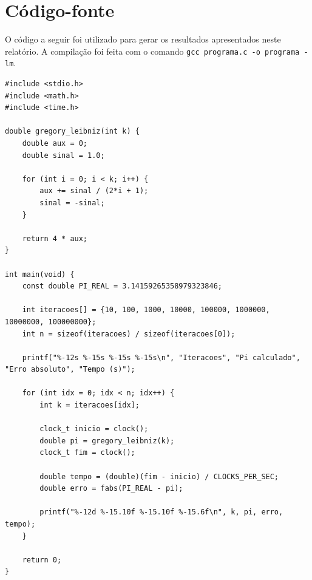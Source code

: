 \documentclass[a4paper,12pt]{article}
\begin{document}
\newpage
\appendix

\section{Código-fonte}
\label{ap:codigo}

O código a seguir foi utilizado para gerar os resultados apresentados neste
relatório. A compilação foi feita com o comando \texttt{gcc programa.c -o
programa -lm}.

\begin{lstlisting}[style=cstyle, caption={Cálculo da aproximação de $\pi$ pela série de Gregory-Leibniz}, label={lst:codigo}]
#include <stdio.h>
#include <math.h>
#include <time.h>

double gregory_leibniz(int k) {
    double aux = 0;
    double sinal = 1.0;

    for (int i = 0; i < k; i++) {
        aux += sinal / (2*i + 1);
        sinal = -sinal;
    }

    return 4 * aux;
}

int main(void) {
    const double PI_REAL = 3.14159265358979323846;

    int iteracoes[] = {10, 100, 1000, 10000, 100000, 1000000, 10000000, 100000000};
    int n = sizeof(iteracoes) / sizeof(iteracoes[0]);

    printf("%-12s %-15s %-15s %-15s\n", "Iteracoes", "Pi calculado", "Erro absoluto", "Tempo (s)");

    for (int idx = 0; idx < n; idx++) {
        int k = iteracoes[idx];

        clock_t inicio = clock();
        double pi = gregory_leibniz(k);
        clock_t fim = clock();

        double tempo = (double)(fim - inicio) / CLOCKS_PER_SEC;
        double erro = fabs(PI_REAL - pi);

        printf("%-12d %-15.10f %-15.10f %-15.6f\n", k, pi, erro, tempo);
    }

    return 0;
}
\end{lstlisting}
\end{document}
